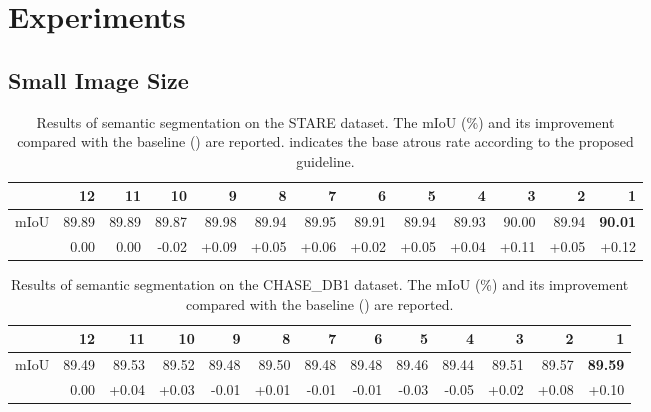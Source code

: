 \documentclass{article}
\begin{document}
\section{Experiments}
\label{sec:exp}

\subsection{Small Image Size}

\begin{table}[t!]
	\caption{Results of semantic segmentation on the STARE dataset. The mIoU (\%) and its improvement  compared with the baseline () are reported.  indicates the base atrous rate according to the proposed guideline.}
	\label{tab:stare}
	\centering
    \begin{adjustbox}{width=\textwidth,center}
	\begin{tabular}{c|rrrrrrrrrrrr}
		\toprule
		      & 12    & 11    & 10    & 9     & 8     & 7     & 6     & 5     & 4     & 3     & 2     & 1          \\
		\midrule
		mIoU     & 89.89 & 89.89 & 89.87 & 89.98 & 89.94 & 89.95 & 89.91 & 89.94 & 89.93 & 90.00 & 89.94 & \textbf{90.01} \\
		 & 0.00  & 0.00  & -0.02 & +0.09 & +0.05 & +0.06 & +0.02 & +0.05 & +0.04 & +0.11 & +0.05 & +0.12          \\
		\bottomrule
	\end{tabular}
    \end{adjustbox}
\end{table}

\begin{table}[t!]
	\caption{Results of semantic segmentation on the CHASE\_DB1 dataset. The mIoU (\%) and its improvement  compared with the baseline () are reported.}
	\label{tab:chase}
	\centering
    \begin{adjustbox}{width=\textwidth,center}
	\begin{tabular}{c|rrrrrrrrrrrr}
		\toprule
		      & 12    & 11    & 10    & 9     & 8     & 7     & 6     & 5     & 4     & 3     & 2     & 1          \\
		\midrule
		mIoU     & 89.49 & 89.53 & 89.52 & 89.48 & 89.50 & 89.48 & 89.48 & 89.46 & 89.44 & 89.51 & 89.57 & \textbf{89.59} \\
		 & 0.00  & +0.04 & +0.03 & -0.01 & +0.01 & -0.01 & -0.01 & -0.03 & -0.05 & +0.02 & +0.08 & +0.10          \\
		\bottomrule
	\end{tabular}
    \end{adjustbox}
\end{table}
\end{document}
